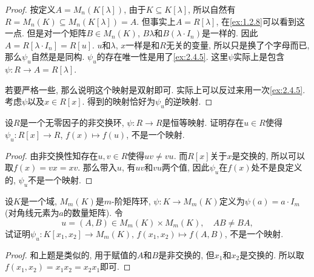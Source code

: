 \begin{proof}
    按定义$A = M_n(K[\lambda])$, 由于$K \subseteq K[\lambda]$, 所以自然有$R = M_n(K) \subseteq M_n(K[\lambda]) = A$. 但事实上$A = R[\lambda]$, 在\ref{ex:1.2.8}可以看到这一点. 但是对一个矩阵$B \in M_n(K)$, $B\lambda$和$B(\lambda \cdot I_n)$是一样的. 因此$A = R[\lambda \cdot I_n] = R[u]$. $u$和$\lambda$, $x$一样是和$R$无关的变量, 所以只是换了个字母而已, 那么$\psi_u$自然是是同构. $\psi_u$的存在唯一性是用了\ref{ex:2.4.5}. 这里$\psi$实际上是包含$\psi:R \to A = R[\lambda]$.

    若要严格一些, 那么说明这个映射是双射即可. 实际上可以反过来用一次\ref{ex:2.4.5}. 考虑$\psi$以及$x \in R[x]$. 得到的映射恰好为$\psi_u$的逆映射.
\end{proof}

\begin{problem}\label{ex:2.4.7}
    设$R$是一个无零因子的非交换环, $\psi:R \to R$是恒等映射. 证明存在$u \in R$使得$\psi_u:R[x] \to R$, $f(x) \mapsto f(u)$, 不是一个映射.
\end{problem}
    
\begin{proof}
    由非交换性知存在$u, v \in R$使得$uv \neq vu$. 而$R[x]$关于$x$是交换的, 所以可以取$f(x) = vx = xv$. 那么带入$u$, 有$uv$和$vu$两个值, 因此$\psi_u$在$f(x)$处不是良定义的, $\psi_u$不是一个映射.
\end{proof}

\begin{problem}\label{ex:2.4.8}
    设$K$是一个域, $M_m(K)$是$m$-阶矩阵环, $\psi:K \to M_m(K)$定义为$\psi(a) = a \cdot I_{m}$(对角线元素为$a$的数量矩阵). 令
    \[
        u = (A, B) \in M_m(K) \times M_m(K),\quad AB \neq BA,
    \]
    试证明$\psi_u:K[x_1, x_2] \to M_m(K),\, f(x_1, x_2) \mapsto f(A, B)$, 不是一个映射.
\end{problem}

\begin{proof}
    和上题是类似的, 用于赋值的$A$和$B$是非交换的, 但$x_1$和$x_2$是交换的. 所以取$f(x_1, x_2) = x_1x_2 = x_2x_1$即可.
\end{proof}

